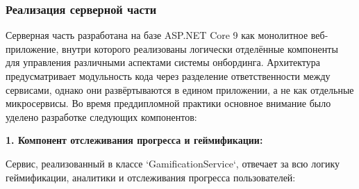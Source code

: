 \subsubsection*{Реализация серверной части}

Серверная часть разработана на базе ASP.NET Core 9 как монолитное веб-приложение, внутри которого реализованы логически отделённые компоненты для управления различными аспектами системы онбординга. Архитектура предусматривает модульность кода через разделение ответственности между сервисами, однако они развёртываются в едином приложении, а не как отдельные микросервисы. Во время преддипломной практики основное внимание было уделено разработке следующих компонентов:

\textbf{1. Компонент отслеживания прогресса и геймификации:}

Сервис, реализованный в классе `GamificationService`, отвечает за всю логику геймификации, аналитики и отслеживания прогресса пользователей:
